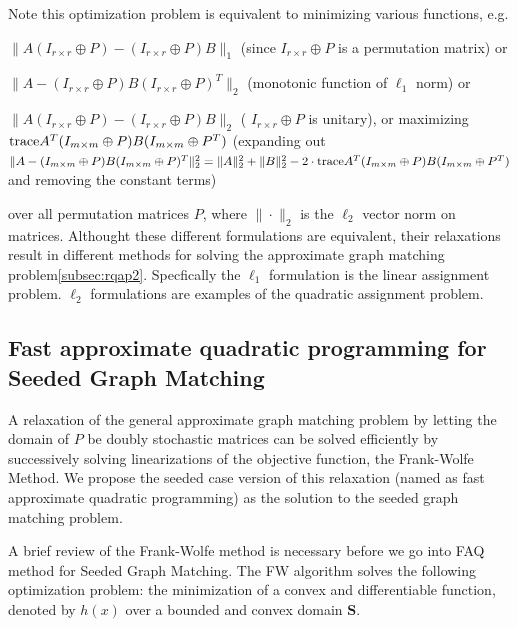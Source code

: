 \documentclass[12pt,oneside,final]{thesis}\usepackage[]{graphicx}\usepackage[]{color}
\begin{document}
   
 Note this optimization problem is equivalent to minimizing various functions, e.g.
 
$\|A(I_{r \times r}\oplus P)-(I_{r \times r}\oplus P)B\|_1$ (since $I_{r \times r}\oplus P$ is a permutation matrix) or

$\|A-(I_{r \times r}\oplus P)B(I_{r \times r}\oplus P)^T\|_2$ (monotonic function of $\ell_1$ norm) or

$\|A(I_{r \times r}\oplus P)-(I_{r \times r}\oplus P)B\|_2$ ( $I_{r \times r}\oplus P$ is unitary), or 
maximizing 
$\textup{trace} {A^T(I_{m \times m}\oplus P)B(I_{m \times m}\oplus P^T)}$ (expanding out $\|A-(I_{m \times m}\oplus P)B(I_{m \times m}\oplus P)^T\|_2^2=
\|A\|_2^2 + \|B\|_2^2
- 2 \cdot \textup{trace}{A^T(I_{m \times m}\oplus P)B(I_{m \times m}\oplus P^T)}$  and removing the constant terms)

over all permutation matrices $P$,
where $\| \cdot \|_2$ is the $\ell_2$ vector norm on matrices.   Althought these different formulations  are equivalent, their relaxations result in different methods for solving the approximate graph matching problem\ref{subsec:rqap2}. Specfically the $\ell_1$ formulation is the  linear assignment problem. $\ell_2$ formulations are examples of the quadratic assignment problem.

 


\subsection{Fast approximate quadratic programming for Seeded Graph Matching}


A relaxation of the general   approximate graph matching problem by letting the  domain of $P$ be doubly stochastic matrices can be solved efficiently by successively solving linearizations of the objective function, the Frank-Wolfe Method. We propose the seeded case version of this relaxation (named as fast approximate quadratic programming)  as the solution to the seeded graph matching problem.

A brief review of the Frank-Wolfe method is necessary before we go into FAQ method for Seeded Graph Matching. The FW algorithm solves the following optimization problem: the minimization of a convex and differentiable function, denoted by $h(x)$ 
over a bounded and convex domain $\mathbf{S}$. 
\end{document}
